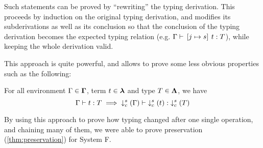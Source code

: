 Such statements can be proved by ``rewriting'' the typing derivation.
This proceeds by induction on the original typing derivation, and modifies its subderivations as well as its conclusion so that the conclusion of the typing derivation becomes the expected typing relation (e.g. ${\Gamma \vdash{} \left[{j} \mapsto{} {s}\right]\:{t} : {T}}$), while keeping the whole derivation valid.

This approach is quite powerful, and allows to prove some less obvious properties such as the following:
\begin{lemma}\label{thm:types_shift}
    For all environment $\Gamma \in \bm\Gamma$, term $t \in \bm\lambda$ and type $T \in \bm\Lambda$, we have
    \[\Gamma \vdash{} t : {T} \implies {\downarrow^{s}_{c}\left({\Gamma}\right)} \vdash{} {\downarrow^{s}_{c}\left({t}\right)} : {{\downarrow^{s}_{c}\left({T}\right)}}\]
\end{lemma}

\noindent
By using this approach to prove how typing changed after one single operation,
and chaining many of them, we were able to prove preservation (\cref{thm:preservation}) for System F.